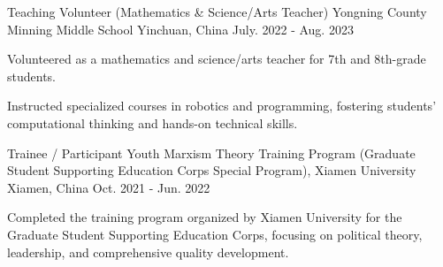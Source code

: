 

\begin{cventries}

  \cventry
    {Teaching Volunteer (Mathematics \& Science/Arts Teacher)} %
    {Yongning County Minning Middle School} %
    {Yinchuan, China} %
    {July. 2022 - Aug. 2023} %
    {
      \begin{cvitems} %
        \item {Volunteered as a mathematics and science/arts teacher for 7th and 8th-grade students.}
        \item {Instructed specialized courses in robotics and programming, fostering students' computational thinking and hands-on technical skills.}
      \end{cvitems}
    }

  \cventry
    {Trainee / Participant} %
    {Youth Marxism Theory Training Program (Graduate Student Supporting Education Corps Special Program), Xiamen University} %
    {Xiamen, China} %
    {Oct. 2021 - Jun. 2022} %
    {
      \begin{cvitems} %
        \item {Completed the training program organized by Xiamen University for the Graduate Student Supporting Education Corps, focusing on political theory, leadership, and comprehensive quality development.}
      \end{cvitems}
    }

\end{cventries}
